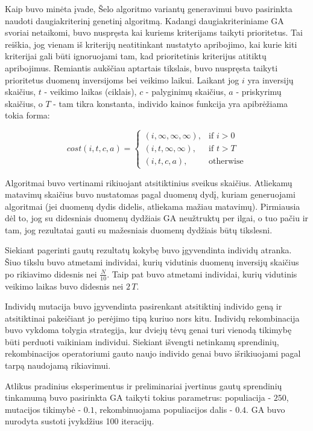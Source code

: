 \documentclass{VUMIFInfBakalaurinis}
\begin{document}
Kaip buvo minėta įvade, Šelo algoritmo variantų generavimui buvo pasirinkta naudoti daugiakriterinį genetinį algoritmą.
Kadangi daugiakriteriniame GA svoriai netaikomi, buvo nuspręsta kai kuriems kriterijams taikyti prioritetus.
Tai reiškia, jog vienam iš kriterijų neatitinkant nustatyto apribojimo, kai kurie kiti kriterijai gali būti ignoruojami
tam, kad prioritetinis kriterijus atitiktų apribojimus.
Remiantis aukščiau aptartais tikslais, buvo nuspręsta taikyti prioritetus duomenų inversijoms bei veikimo laikui.
Laikant jog $i$ yra inversijų skaičius, $t$ - veikimo laikas (ciklais),
$c$ - palyginimų skaičius, $a$ - priskyrimų skaičius, o $T$ - tam tikra konstanta,
individo kainos funkcija yra apibrėžiama tokia forma:

\[
  cost(i, t, c, a)=
  \begin{cases}
    (i, \infty, \infty, \infty),& \text{if } i > 0\\
    (i, t, \infty, \infty),& \text{if } t > T\\
    (i, t, c, a), & \text{otherwise}
  \end{cases}
\]

Algoritmai buvo vertinami rikiuojant atsitiktinius sveikus skaičius.
Atliekamų matavimų skaičius buvo nustatomas pagal duomenų dydį, kuriam generuojami algoritmai (jei duomenų dydis didelis, atliekama mažiau matavimų).
Pirmiausia dėl to, jog su didesniais duomenų dydžiais GA neužtruktų per ilgai, o tuo pačiu ir tam,
jog rezultatai gauti su mažesniais duomenų dydžiais būtų tikslesni.

Siekiant pagerinti gautų rezultatų kokybę buvo įgyvendinta individų atranka.
Šiuo tikslu buvo atmetami individai, kurių vidutinis duomenų inversijų skaičius po rikiavimo didesnis nei $\frac{N}{10}$.
Taip pat buvo atmetami individai, kurių vidutinis veikimo laikas buvo didesnis nei $2\,T$.

Individų mutacija buvo įgyvendinta pasirenkant atsitiktinį individo geną ir atsitiktinai pakeičiant jo perėjimo tipą kuriuo nors kitu.
Individų rekombinacija buvo vykdoma tolygia strategija, kur dviejų tėvų genai turi vienodą tikimybę
būti perduoti vaikiniam individui.
Siekiant išvengti netinkamų sprendinių, rekombinacijos operatoriumi gauto naujo individo genai buvo išrikiuojami pagal tarpą naudojamą rikiavimui.

Atlikus pradinius eksperimentus ir preliminariai įvertinus gautų sprendinių tinkamumą buvo pasirinkta GA taikyti tokius parametrus:
populiacija - $250$, mutacijos tikimybė - $0.1$, rekombinuojama populiacijos dalis - $0.4$.
GA buvo nurodyta sustoti įvykdžius 100 iteracijų.
\end{document}

